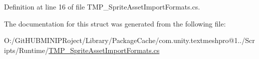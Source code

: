 Definition at line 16 of file T\+M\+P\+\_\+\+Sprite\+Asset\+Import\+Formats.\+cs.



The documentation for this struct was generated from the following file\+:\begin{DoxyCompactItemize}
\item 
O\+:/\+Git\+H\+U\+B\+M\+I\+N\+I\+P\+Roject/\+Library/\+Package\+Cache/com.\+unity.\+textmeshpro@1../\+Scripts/\+Runtime/\mbox{\hyperlink{_t_m_p___sprite_asset_import_formats_8cs}{T\+M\+P\+\_\+\+Sprite\+Asset\+Import\+Formats.\+cs}}\end{DoxyCompactItemize}
